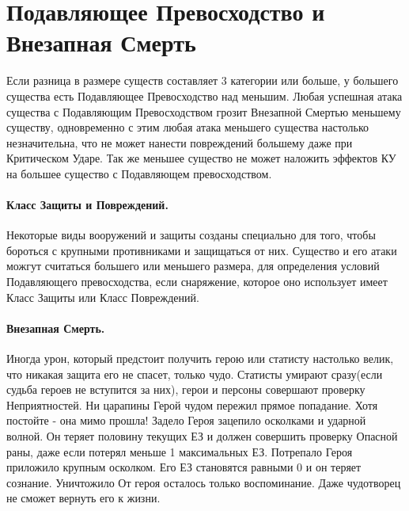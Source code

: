 \section{Подавляющее Превосходство и Внезапная Смерть}
Если разница в размере существ составляет 3 категории или больше, у большего существа есть Подавляющее Превосходство над меньшим. Любая успешная атака существа с Подавляющим Превосходством грозит Внезапной Смертью меньшему существу, одновременно с этим любая атака меньшего существа настолько незначительна, что не может нанести повреждений большему даже при Критическом Ударе. Так же меньшее существо не может наложить эффектов КУ на большее существо с Подавляющем превосходством.
\paragraph{Класс Защиты и Повреждений.} Некоторые виды вооружений и защиты созданы специально для того, чтобы бороться с крупными противниками и защищаться от них. Существо и его атаки можгут считаться большего или меньшего размера, для определения условий Подавляющего превосходства, если снаряжение, которое оно использует имеет Класс Защиты или Класс Повреждений.

\paragraph{Внезапная Смерть.} Иногда урон, который предстоит получить герою или статисту настолько велик, что никакая защита его не спасет, только чудо. Статисты умирают сразу(если судьба героев не вступится за них), герои и персоны совершают проверку Неприятностей.
\trouble
{Ни царапины}%
{Герой чудом пережил прямое попадание. Хотя постойте - она мимо прошла!}%
{Задело}%
{Героя зацепило осколками и ударной волной. Он теряет половину текущих ЕЗ и должен совершить проверку Опасной раны, даже если потерял меньше 1\4 максимальных ЕЗ.}%
{Потрепало}%
{Героя приложило крупным осколком. Его ЕЗ становятся равными 0 и он теряет сознание.}%
{Уничтожило}%
{От героя осталось только воспоминание. Даже чудотворец не сможет вернуть его к жизни.}%